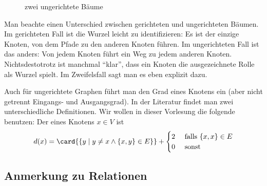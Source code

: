\begin{figure}[ht] \centering
  \caption{zwei ungerichtete Bäume}
  \label{abb:ungerichtete-baeume}
\end{figure}

\noindent Man beachte einen Unterschied zwischen gerichteten und
ungerichteten Bäumen.
% 
Im gerichteten Fall ist die Wurzel leicht zu identifizieren: Es ist
der einzige Knoten, von dem Pfade zu den anderen Knoten führen. Im
ungerichteten Fall ist das anders: Von jedem Knoten führt ein Weg zu
jedem anderen Knoten.
% 
Nichtsdestotrotz ist manchmal "`klar"', dass ein Knoten die
ausgezeichnete Rolle als Wurzel spielt.
% 
Im Zweifelsfall sagt man es eben explizit dazu.

Auch für ungerichtete Graphen führt man den Grad eines Knotens ein
(aber nicht getrennt Eingangs- und Ausgangsgrad).
% 
In der Literatur findet man zwei unterschiedliche Definitionen.
% 
Wir wollen in dieser Vorlesung die folgende benutzen: Der
 eines Knotens $x\in V$ ist
\[ d(x) = \card{\{y \mid y\not= x \land \{x,y\} \in E\}} +
  \begin{cases} 2 & \text{ falls } \{x,x\}\in E \\ 0 & \text{ sonst}
  \end{cases}
\]

\begin{extract*}
  \subsection{Anmerkung zu Relationen}
\end{extract*}
\label{subsec:symm-rel-equiv-rel}

